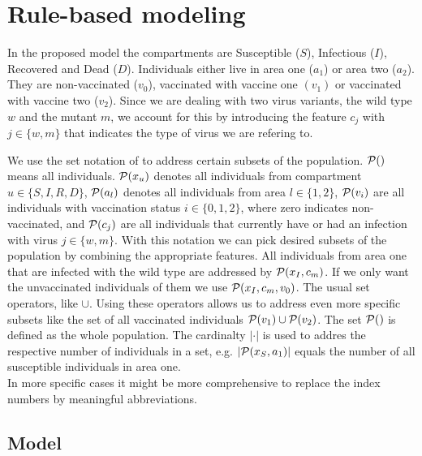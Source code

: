 \section{Rule-based modeling}

In the proposed model the compartments are Susceptible ($S$), Infectious ($I$), Recovered and Dead ($D$). Individuals either live in area one ($a_1$) or area two ($a_2$). They are non-vaccinated ($v_0$), vaccinated with vaccine one $(v_1)$ or vaccinated with vaccine two ($v_2$). Since we are dealing with two virus variants, the wild type $w$ and the mutant $m$, we account for this by introducing the feature $c_j$ with $j \in \{w,m\}$ that indicates the type of virus we are refering to. 
 
We use the set notation of \cite{Waites.2021} to address certain subsets of the population. $\mathcal{P}()$ means all individuals. $\mathcal{P}(x_u)$ denotes all individuals from compartment $u \in \{S, I, R, D \}$, $\mathcal{P}(a_l)$ denotes all individuals from area $l \in \{1,2\}$, $\mathcal{P}(v_i)$ are all individuals with vaccination status $i \in \{0,1,2\}$, where zero indicates non-vaccinated, and $\mathcal{P}(c_j)$ are all individuals that currently have or had an infection with virus $j \in \{w,m\}$. With this notation we can pick desired subsets of the population by combining the appropriate features. All individuals from area one that are infected with the wild type are addressed by $\mathcal{P}(x_I, c_m)$. If we only want the unvaccinated individuals of them we use $\mathcal{P}(x_I, c_m, v_0)$. The usual set operators, like $\cup$. Using these operators allows us to address even more specific subsets like the set of all vaccinated individuals $\mathcal{P}(v_1) \cup \mathcal{P}(v_2)$. The set $\mathcal{P}()$ is defined as the whole population. The cardinalty $|\cdot|$ is used to addres the respective number of individuals in a set, e.g. $|\mathcal{P}(x_S, a_1)|$ equals the number of all susceptible individuals in area one.\\

In more specific cases it might be more comprehensive to replace the index numbers by meaningful abbreviations.

\subsection{Model}

